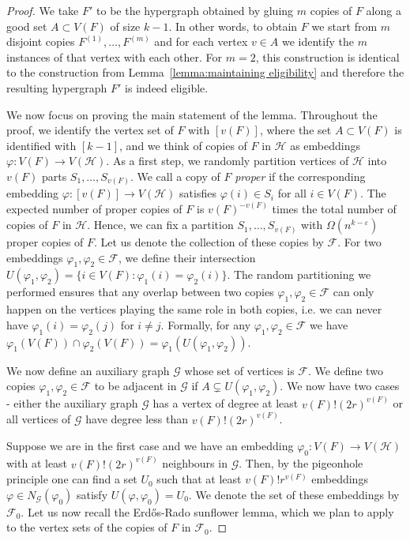 \documentclass{daj}
\def\eps{\varepsilon}
\def\cF{\mathcal{F}}
\def\cG{\mathcal{G}}
\def\cH{\mathcal{H}}
\theoremstyle{plain}
\theoremstyle{remark}
\begin{document}
\begin{proof}
We take $F'$ to be the hypergraph obtained by gluing $m$ copies of $F$ along a good set $A\subset V(F)$ of size $k-1$. In other words, to obtain $F$ we start from $m$ disjoint copies $F^{(1)}, \dots, F^{(m)}$ and for each vertex $v\in A$ we identify the $m$ instances of that vertex with each other. For $m=2$, this construction is identical to the construction from Lemma~\ref{lemma:maintaining eligibility} and therefore the resulting hypergraph $F'$ is indeed eligible. 

We now focus on proving the main statement of the lemma. Throughout the proof, we identify the vertex set of $F$ with $[v(F)]$, where the set $A \subset V(F)$ is identified with $[k-1]$, and we think of copies of $F$ in $\cH$ as embeddings $\varphi:V(F)\to V(\cH)$. As a first step, we randomly partition vertices of $\cH$ into $v(F)$ parts $S_1, \dots, S_{v(F)}$. We call a copy of $F$ \textit{proper} if the corresponding embedding $\varphi:[v(F)]\to V(\cH)$ satisfies $\varphi(i)\in S_i$ for all $i\in V(F)$. The expected number of proper copies of $F$ is $v(F)^{-v(F)}$ times the total number of copies of $F$ in $\cH$. Hence, we can fix a partition $S_1, \dots, S_{v(F)}$ with $\Omega(n^{k-\eps})$ proper copies of $F$. Let us denote the collection of these copies by $\cF$. For two embeddings $\varphi_1, \varphi_2\in \cF$, we define their intersection $U(\varphi_1, \varphi_2)=\{i\in V(F):\varphi_1(i)=\varphi_2(i)\}$. The random partitioning we performed ensures that any overlap between two copies $\varphi_1, \varphi_2\in \cF$ can only happen on the vertices playing the same role in both copies, i.e. we can never have $\varphi_1(i)=\varphi_2(j)$ for $i\neq j$. Formally, for any $\varphi_1, \varphi_2\in \cF$ we have $\varphi_1(V(F))\cap \varphi_2(V(F))=\varphi_1(U(\varphi_1, \varphi_2))$.

We now define an auxiliary graph $\cG$ whose set of vertices is $\cF$. We define two copies $\varphi_1, \varphi_2\in \cF$ to be adjacent in $\cG$ if $A\subsetneq U(\varphi_1, \varphi_2)$. We now have two cases - either the auxiliary graph $\cG$ has a vertex of degree at least $v(F)!(2r)^{v(F)}$ or all vertices of $\cG$ have degree less than $v(F)!(2r)^{v(F)}$.

Suppose we are in the first case and we have an embedding $\varphi_0:V(F)\to V(\cH)$ with at least $v(F)!(2r)^{v(F)}$ neighbours in $\cG$. Then, by the pigeonhole principle one can find a set $U_0$ such that at least $v(F)!r^{v(F)}$ embeddings $\varphi\in N_{\cG}(\varphi_0)$ satisfy $U(\varphi, \varphi_0)=U_0$. We denote the set of these embeddings by $\cF_0$. Let us now recall the Erd\H{o}s-Rado sunflower lemma, which we plan to apply to the vertex sets of the copies of $F$ in $\cF_0$.


\end{proof}
\end{document}
